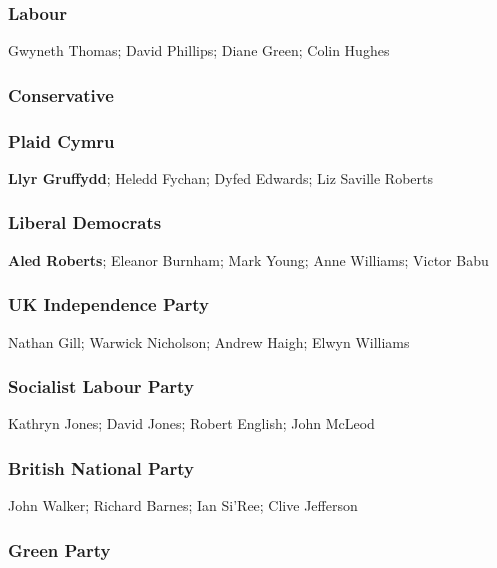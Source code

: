 \begin{resultsiii}
\subsubsection*{Labour}

Gwyneth Thomas; David Phillips; Diane Green; Colin Hughes

\subsubsection*{Conservative}


\subsubsection*{Plaid Cymru}

\textbf{Llyr Gruffydd}; Heledd Fychan; Dyfed Edwards; Liz Saville Roberts

\subsubsection*{Liberal Democrats}

\textbf{Aled Roberts}; Eleanor Burnham; Mark Young; Anne Williams; Victor Babu

\subsubsection*{UK Independence Party}

Nathan Gill; Warwick Nicholson; Andrew Haigh; Elwyn Williams

\subsubsection*{Socialist Labour Party}

Kathryn Jones; David Jones; Robert English; John McLeod

\subsubsection*{British National Party}

John Walker; Richard Barnes; Ian Si'Ree; Clive Jefferson

\subsubsection*{Green Party}


\end{resultsiii}
